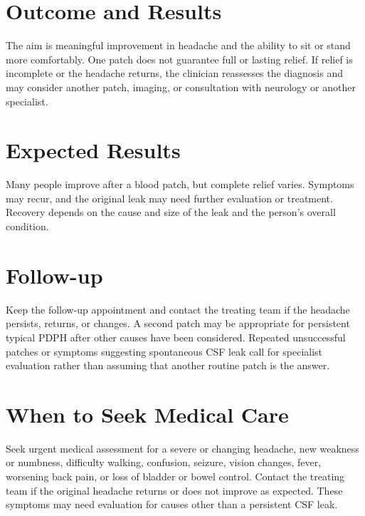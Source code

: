 \section*{Outcome and Results}
The aim is meaningful improvement in headache and the ability to sit or stand more comfortably. One patch does not guarantee full or lasting relief. If relief is incomplete or the headache returns, the clinician reassesses the diagnosis and may consider another patch, imaging, or consultation with neurology or another specialist.

\section*{Expected Results}
Many people improve after a blood patch, but complete relief varies. Symptoms may recur, and the original leak may need further evaluation or treatment. Recovery depends on the cause and size of the leak and the person's overall condition.

\section*{Follow-up}
Keep the follow-up appointment and contact the treating team if the headache persists, returns, or changes. A second patch may be appropriate for persistent typical PDPH after other causes have been considered. Repeated unsuccessful patches or symptoms suggesting spontaneous CSF leak call for specialist evaluation rather than assuming that another routine patch is the answer.

\section*{When to Seek Medical Care}
Seek urgent medical assessment for a severe or changing headache, new weakness or numbness, difficulty walking, confusion, seizure, vision changes, fever, worsening back pain, or loss of bladder or bowel control. Contact the treating team if the original headache returns or does not improve as expected. These symptoms may need evaluation for causes other than a persistent CSF leak.

